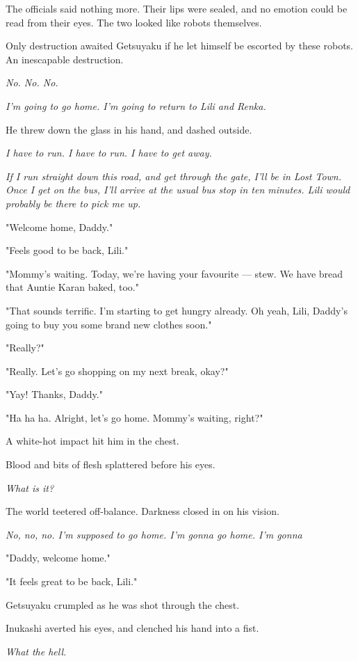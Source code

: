 The officials said nothing more. Their lips were sealed, and no emotion
could be read from their eyes. The two looked like robots themselves.

Only destruction awaited Getsuyaku if he let himself be escorted by
these robots. An inescapable destruction.

\emph{No. No. No.}

\emph{I'm going to go home. I'm going to return to Lili and Renka.}

He threw down the glass in his hand, and dashed outside.

\emph{I have to run. I have to run. I have to get away.}

\emph{If I run straight down this road, and get through the gate, I'll be in
Lost Town. Once I get on the bus, I'll arrive at the usual bus stop in
ten minutes. Lili would probably be there to pick me up.}

"Welcome home, Daddy."

"Feels good to be back, Lili."

"Mommy's waiting. Today, we're having your favourite --- stew. We have
bread that Auntie Karan baked, too."

"That sounds terrific. I'm starting to get hungry already. Oh yeah,
Lili, Daddy's going to buy you some brand new clothes soon."

"Really?"

"Really. Let's go shopping on my next break, okay?"

"Yay! Thanks, Daddy."

"Ha ha ha. Alright, let's go home. Mommy's waiting, right?"

A white-hot impact hit him in the chest.

Blood and bits of flesh splattered before his eyes.

\emph{What is it?}

The world teetered off-balance. Darkness closed in on his vision.

\emph{No, no, no. I'm supposed to go home. I'm gonna go home. I'm gonna\el }

"Daddy, welcome home."

"It feels great to be back, Lili."

Getsuyaku crumpled as he was shot through the chest.

\myspace

Inukashi averted his eyes, and clenched his hand into a fist.

\emph{What the hell.}

